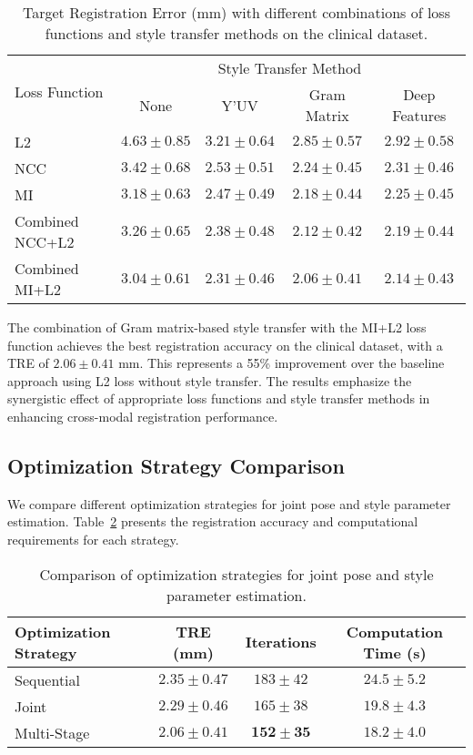 \begin{table}[htpb]
  \caption[Target Registration Error with different combinations]{Target Registration Error (mm) with different combinations of loss functions and style transfer methods on the clinical dataset.}\label{tab:style_registration}
  \centering
  \begin{tabular}{l c c c c}
    \toprule
      \multirow{2}{*}{Loss Function} & \multicolumn{4}{c}{Style Transfer Method} \\
      \cmidrule{2-5}
      & None & Y'UV & Gram Matrix & Deep Features \\
    \midrule
      L2 & $4.63 \pm 0.85$ & $3.21 \pm 0.64$ & $2.85 \pm 0.57$ & $2.92 \pm 0.58$ \\
      NCC & $3.42 \pm 0.68$ & $2.53 \pm 0.51$ & $2.24 \pm 0.45$ & $2.31 \pm 0.46$ \\
      MI & $3.18 \pm 0.63$ & $2.47 \pm 0.49$ & $2.18 \pm 0.44$ & $2.25 \pm 0.45$ \\
      Combined NCC+L2 & $3.26 \pm 0.65$ & $2.38 \pm 0.48$ & $2.12 \pm 0.42$ & $2.19 \pm 0.44$ \\
      Combined MI+L2 & $3.04 \pm 0.61$ & $2.31 \pm 0.46$ & $\mathbf{2.06 \pm 0.41}$ & $2.14 \pm 0.43$ \\
    \bottomrule
  \end{tabular}
\end{table}

The combination of Gram matrix-based style transfer with the MI+L2 loss function achieves the best registration accuracy on the clinical dataset, with a TRE of $2.06 \pm 0.41$ mm. This represents a 55\% improvement over the baseline approach using L2 loss without style transfer. The results emphasize the synergistic effect of appropriate loss functions and style transfer methods in enhancing cross-modal registration performance.

\subsection{Optimization Strategy Comparison}

We compare different optimization strategies for joint pose and style parameter estimation. Table~\ref{tab:optimization_strategy} presents the registration accuracy and computational requirements for each strategy.

\begin{table}[htpb]
  \caption[Comparison of optimization strategies]{Comparison of optimization strategies for joint pose and style parameter estimation.}\label{tab:optimization_strategy}
  \centering
  \begin{tabular}{l c c c}
    \toprule
      Optimization Strategy & TRE (mm) & Iterations & Computation Time (s) \\
    \midrule
      Sequential & $2.35 \pm 0.47$ & $183 \pm 42$ & $24.5 \pm 5.2$ \\
      Joint & $2.29 \pm 0.46$ & $165 \pm 38$ & $19.8 \pm 4.3$ \\
      Multi-Stage & $\mathbf{2.06 \pm 0.41}$ & $\mathbf{152 \pm 35}$ & $\mathbf{18.2 \pm 4.0}$ \\
    \bottomrule
  \end{tabular}
\end{table}

